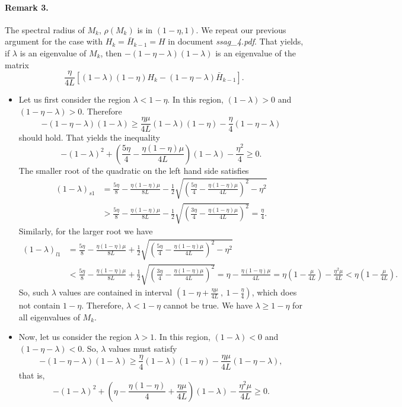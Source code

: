 \documentclass[11pt]{article}
\begin{document}
\paragraph{Remark 3.} The spectral radius of $M_k$, $\rho(M_k)$ is in $(1-\eta,1)$.  We repeat our previous argument for the case with $H_k=\bar H_{k-1}=H$ in document \emph{ssag\_4.pdf}.  That yields, if $\lambda$ is an eigenvalue of $M_k$, then 
$ -(1-\eta-\lambda)(1-\lambda)$ is an eigenvalue of the matrix 
\[
 \frac{\eta}{4L}[(1-\lambda)(1-\eta)H_k-(1-\eta-\lambda)\bar H_{k-1}].
\]
\begin{itemize}
\item Let us first consider the region $\lambda<1-\eta$.  In this region, $(1-\lambda)>0$ and $(1-\eta-\lambda)>0$.  Therefore
\[
 -(1-\eta-\lambda)(1-\lambda)\geq\frac{\eta\mu}{4L}(1-\lambda)(1-\eta)-\frac{\eta}{4}(1-\eta-\lambda)
\]
should hold. That yields the inequality
\[
   -(1-\lambda)^2 +\left(\frac{5\eta}{4}-\frac{\eta(1-\eta)\mu}{4L}\right)(1-\lambda)-\frac{\eta^2}{4} \geq 0.
\]
The smaller root of the quadratic on the left hand side satisfies 
  \begin{align*}
   (1-\lambda)_{s1} &= \frac{5\eta}{8}-\frac{\eta(1-\eta)\mu}{8L}-\frac{1}{2}\sqrt{\left(\frac{5\eta}{4}-\frac{\eta(1-\eta)\mu}{4L}\right)^2-\eta^2}\\ 
   &> \frac{5\eta}{8}-\frac{\eta(1-\eta)\mu}{8L}-\frac{1}{2}\sqrt{\left(\frac{3\eta}{4}-\frac{\eta(1-\eta)\mu}{4L}\right)^2} = \frac{\eta}{4}.
  \end{align*}
 Similarly, for the larger root we have
  \begin{align*}
   (1-\lambda)_{l1} &= \frac{5\eta}{8}-\frac{\eta(1-\eta)\mu}{8L}+\frac{1}{2}\sqrt{\left(\frac{5\eta}{4}-\frac{\eta(1-\eta)\mu}{4L}\right)^2-\eta^2}\\ 
   &< \frac{5\eta}{8}-\frac{\eta(1-\eta)\mu}{8L}+\frac{1}{2}\sqrt{\left(\frac{3\eta}{4}-\frac{\eta(1-\eta)\mu}{4L}\right)^2} = \eta-\frac{\eta(1-\eta)\mu}{4L} = \eta(1-\frac{\mu}{4L}) - \frac{\eta^2\mu}{4L}<\eta(1-\frac{\mu}{4L}).
  \end{align*}
 So, such $\lambda$ values are contained in interval $\left(\displaystyle1-\eta + \frac{\eta\mu}{4L} \ , \ 1-\frac{\eta}{4}\right)$, which does not contain $1-\eta$.  Therefore, $\lambda < 1-\eta$ cannot be true. We have $\lambda\geq 1-\eta$ for all eigenvalues of $M_k$. 
 
 \bigskip
 
 \item Now, let us consider the region  $\lambda>1$. In this region, $(1-\lambda)<0$ and $(1-\eta-\lambda)<0$.  So, $\lambda$ values must satisfy 
 \[
-(1-\eta-\lambda)(1-\lambda)\geq\frac{\eta}{4}(1-\lambda)(1-\eta)-\frac{\eta\mu}{4L}(1-\eta-\lambda),
\]
that is,
  \[
   -(1-\lambda)^2+\left(\eta-\frac{\eta(1-\eta)}{4}+\frac{\eta\mu}{4L}\right)(1-\lambda)-\frac{\eta^2\mu}{4L}\geq 0.
  \]
\end{itemize}
\end{document}
